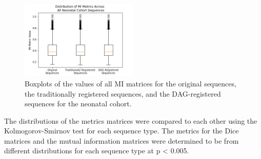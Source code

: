 \begin{figure}
\centering
\includegraphics[width=0.5\textwidth]{6/figures/neonates-mi-box.png}
\caption{Boxplots of the values of all MI matrices for the original sequences, the traditionally registered sequences, and the DAG-registered sequences for the neonatal cohort.}
\label{fig:neonates-mi-box}
\end{figure}

The distributions of the metrics matrices were compared to each other using the Kolmogorov-Smirnov test for each sequence type. The metrics for the Dice matrices and the mutual information matrices were determined to be from different distributions for each sequence type at p < 0.005.

